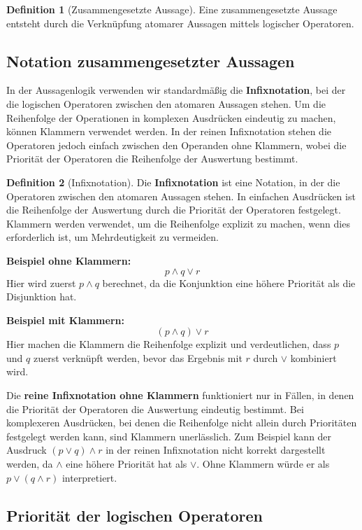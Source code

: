 \documentclass{book}
\theoremstyle{plain}
\theoremstyle{remark}
\theoremstyle{definition}
\newtheorem{definition}{Definition}[section]
\begin{document}
\begin{definition}[Zusammengesetzte Aussage]
Eine zusammengesetzte Aussage entsteht durch die Verknüpfung atomarer Aussagen mittels logischer Operatoren.
\end{definition}

\subsection{Notation zusammengesetzter Aussagen}

In der Aussagenlogik verwenden wir standardmäßig die \textbf{Infixnotation}, bei der die logischen Operatoren zwischen den atomaren Aussagen stehen. Um die Reihenfolge der Operationen in komplexen Ausdrücken eindeutig zu machen, können Klammern verwendet werden. In der reinen Infixnotation stehen die Operatoren jedoch einfach zwischen den Operanden ohne Klammern, wobei die Priorität der Operatoren die Reihenfolge der Auswertung bestimmt.

\begin{definition}[Infixnotation]
Die \textbf{Infixnotation} ist eine Notation, in der die Operatoren zwischen den atomaren Aussagen stehen. In einfachen Ausdrücken ist die Reihenfolge der Auswertung durch die Priorität der Operatoren festgelegt. Klammern werden verwendet, um die Reihenfolge explizit zu machen, wenn dies erforderlich ist, um Mehrdeutigkeit zu vermeiden.

\textbf{Beispiel ohne Klammern:} 
\[
p \land q \lor r
\]
Hier wird zuerst \(p \land q\) berechnet, da die Konjunktion eine höhere Priorität als die Disjunktion hat.

\textbf{Beispiel mit Klammern:} 
\[
(p \land q) \lor r
\]
Hier machen die Klammern die Reihenfolge explizit und verdeutlichen, dass \(p\) und \(q\) zuerst verknüpft werden, bevor das Ergebnis mit \(r\) durch \(\lor\) kombiniert wird.
\end{definition}

Die \textbf{reine Infixnotation ohne Klammern} funktioniert nur in Fällen, in denen die Priorität der Operatoren die Auswertung eindeutig bestimmt. Bei komplexeren Ausdrücken, bei denen die Reihenfolge nicht allein durch Prioritäten festgelegt werden kann, sind Klammern unerlässlich. Zum Beispiel kann der Ausdruck \((p \lor q) \land r\) in der reinen Infixnotation nicht korrekt dargestellt werden, da \(\land\) eine höhere Priorität hat als \(\lor\). Ohne Klammern würde er als \(p \lor (q \land r)\) interpretiert.

\subsection{Priorität der logischen Operatoren}
\end{document}
